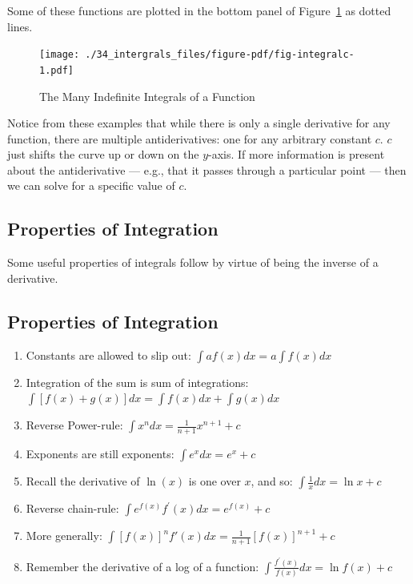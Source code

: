 \documentclass[
  letterpaper,
]{book}
\providecommand{\tightlist}{%
  \setlength{\itemsep}{0pt}\setlength{\parskip}{0pt}}\usepackage{longtable,booktabs,array}
\theoremstyle{definition}
\theoremstyle{definition}
\theoremstyle{plain}
\theoremstyle{definition}
\theoremstyle{plain}
\theoremstyle{plain}
\theoremstyle{remark}
\begin{document}
Some of these functions are plotted in the bottom panel of
Figure~\ref{fig-integralc} as dotted lines.

\begin{figure}

{\centering \texttt{[image: ./34\_intergrals\_files/figure-pdf/fig-integralc-1.pdf]}

}

\caption{\label{fig-integralc}The Many Indefinite Integrals of a
Function}

\end{figure}

Notice from these examples that while there is only a single derivative
for any function, there are multiple antiderivatives: one for any
arbitrary constant \(c\). \(c\) just shifts the curve up or down on the
\(y\)-axis. If more information is present about the antiderivative ---
e.g., that it passes through a particular point --- then we can solve
for a specific value of \(c\).

\hypertarget{properties-of-integration}{%
\subsection*{Properties of
Integration}\label{properties-of-integration}}

Some useful properties of integrals follow by virtue of being the
inverse of a derivative.

\hypertarget{prop-}{}
\hypertarget{properties-of-integration-1}{%
\subsection{Properties of
Integration}\label{properties-of-integration-1}}

\begin{enumerate}
\def\labelenumi{\arabic{enumi}.}
\tightlist
\item
  Constants are allowed to slip out: \(\int a f(x)dx = a\int f(x)dx\)
\item
  Integration of the sum is sum of integrations:
  \(\int [f(x)+g(x)]dx=\int f(x)dx + \int g(x)dx\)
\item
  Reverse Power-rule: \(\int x^n dx = \frac{1}{n+1} x^{n+1} + c\)
\item
  Exponents are still exponents: \(\int e^x dx = e^x +c\)
\item
  Recall the derivative of \(\ln(x)\) is one over \(x\), and so:
  \(\int \frac{1}{x} dx = \ln x + c\)
\item
  Reverse chain-rule: \(\int e^{f(x)}f^\prime(x)dx = e^{f(x)}+c\)
\item
  More generally:
  \(\int [f(x)]^n f'(x)dx = \frac{1}{n+1}[f(x)]^{n+1}+c\)
\item
  Remember the derivative of a log of a function:
  \(\int \frac{f^\prime(x)}{f(x)}dx=\ln f(x) + c\)
\end{enumerate}
\end{document}
